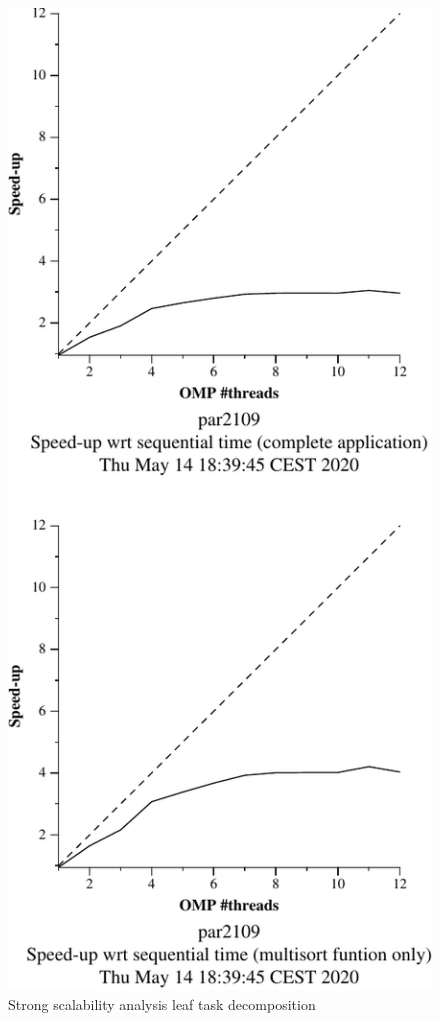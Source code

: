 \begin{figure}[H]
    \begin{minipage}{0.5\textwidth}
        \centering
        \includegraphics[width=0.7\linewidth]{plots/new-omp-leaf-crop.pdf}
        \caption{Strong scalability analysis leaf task decomposition}
        \label{fig:ssa_leaf} 
    \end{minipage}
    \begin{minipage}{0.5\textwidth}
        \centering

\end{minipage}
\end{figure}
